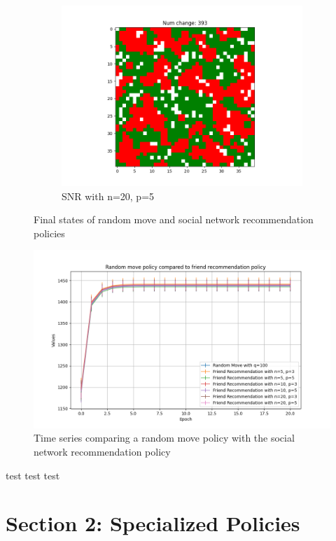 \documentclass[11pt]{article}
\begin{document}
\begin{figure}[h]
\begin{subfigure}{0.14\textwidth}
			\includegraphics[width=\linewidth]{final_social_n20p5.png}
			\caption{\centering SNR with n=20, p=5}
		\end{subfigure}
		\caption{Final states of random move and social network recommendation policies}
	\end{figure}
	\vspace{-1em} %
	\begin{figure}[h]
		\centering
		\includegraphics[width=\textwidth]{policies01.png}
		\caption{Time series comparing a random move policy with the social network recommendation policy}
	\end{figure}
	\FloatBarrier


	test test test


	\newpage
	\section{Section 2: Specialized Policies}
\end{document}

